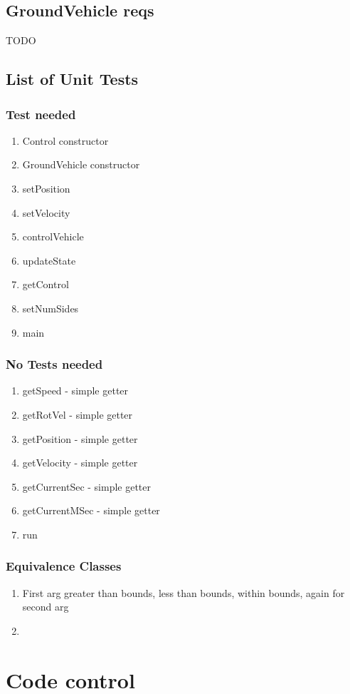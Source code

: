 \documentclass{article}
\begin{document}
\subsection{GroundVehicle reqs}
TODO
\subsection{List of Unit Tests}
\subsubsection{Test needed}
\begin{enumerate}
	\item Control constructor
	\item GroundVehicle constructor
	\item setPosition
	\item setVelocity
	\item controlVehicle
	\item updateState
	\item getControl
	\item setNumSides
	\item main
\end{enumerate}
\subsubsection{No Tests needed}
\begin{enumerate}
	\item getSpeed - simple getter
	\item getRotVel - simple getter
	\item getPosition - simple getter
	\item getVelocity - simple getter
	\item getCurrentSec - simple getter
	\item getCurrentMSec - simple getter
	\item run
\end{enumerate}
\subsubsection{Equivalence Classes}
\begin{enumerate}
	\item First arg greater than bounds, less than bounds, within bounds, again for second arg
	\item 
\end{enumerate}

\section{Code control}
\end{document}
